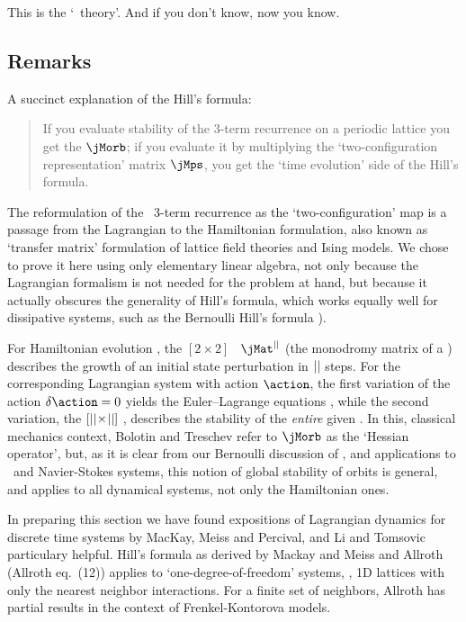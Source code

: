 This is the `\po\ theory'. And if you don't know,
 {now you know}.


\subsection{Remarks}
\label{s:LC21HillForm}

A succinct  explanation of the Hill's formula:
\begin{quote}
If you evaluate stability of the 3-term recurrence  on
a periodic lattice you get the {\jacobianOrb} $\jMorb$;
if you evaluate it by multiplying the `two-configuration representation'
matrix $\jMps$, you get the `time evolution' side of the Hill's formula.
\end{quote}

The reformulation of the \catlatt\ 3-term recurrence
as the `two-configuration' map
is a passage from the Lagrangian to the Hamiltonian formulation, also
known as `transfer matrix' formulation of lattice field
theories and Ising
models. We chose to prove it here using only
elementary linear algebra, not only because the Lagrangian
formalism is not needed for the problem at hand, but because
it actually obscures the generality of Hill's formula, which works
equally well for dissipative systems, such as the Bernoulli Hill's formula
).

For Hamiltonian evolution , the $[2\!\times\!2]$
\jacobianM\ $\jMat^\cl{}$ (the monodromy matrix of a \po) describes
the growth of an initial state perturbation in ${||}$ steps. For the
corresponding Lagrangian system with action $\action$,
the first variation of
the action $\delta\action=0$ yields the Euler–Lagrange equations
, while the second variation, the
$[{||}\!\times\!{||}]$ {\jacobianOrb} ,
describes the stability of the \emph{entire} given \po. In this,
classical mechanics context, Bolotin and Treschev refer to
$\jMorb$ as the `Hessian operator', but, as it is clear from our
Bernoulli discussion of , and applications to \KS\
and Navier-Stokes systems, this notion of global stability
of orbits is general, and applies to all dynamical systems, not only the
Hamiltonian ones.

In preparing this section we have found expositions of Lagrangian
dynamics for discrete time systems by MacKay, Meiss and
Percival, and Li and Tomsovic particulary
helpful.
Hill's formula as derived by Mackay and Meiss and
Allroth (Allroth eq.~(12)) applies to
`one-degree-of-freedom' systems, \ie, 1D lattices with only the nearest
neighbor interactions. For a finite set of neighbors,
Allroth has partial results in the
context of Frenkel-Kontorova models.

